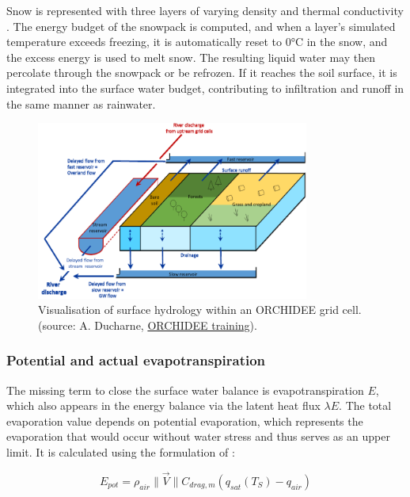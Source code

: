 Snow is represented with three layers of varying density and thermal conductivity \citep{wang_evaluation_2013}. The energy budget of the snowpack is computed, and when a layer's simulated temperature exceeds freezing, it is automatically reset to 0°C in the snow, and the excess energy is used to melt snow. The resulting liquid water may then percolate through the snowpack or be refrozen. If it reaches the soil surface, it is integrated into the surface water budget, contributing to infiltration and runoff in the same manner as rainwater.

\begin{figure}[hbtp]
    \centering
    \includegraphics[width=0.8\textwidth]{images/methods/water_balance_AD.png}
    \caption{Visualisation of surface hydrology within an ORCHIDEE grid cell. (source: A. Ducharne, \href{https://forge.ipsl.fr/orchidee/attachment/wiki/GroupActivities/Training/cours_orchidee_feb2024_ducharne.pdf}{ORCHIDEE training}).}
    \label{fig:water_balance_AD}
\end{figure}


\subsubsection*{Potential and actual evapotranspiration}

The missing term to close the surface water balance is evapotranspiration $E$, which also appears in the energy balance via the latent heat flux $\lambda E$. The total evaporation value depends on potential evaporation, which represents the evaporation that would occur without water stress and thus serves as an upper limit. It is calculated using the formulation of \citet{Budyko_1956}:  

\begin{equation}
    E_{pot} = \rho_{air}  \lVert \vec{V} \rVert C_{drag, m} (q_{sat}(T_S) - q_{air})
\end{equation}

